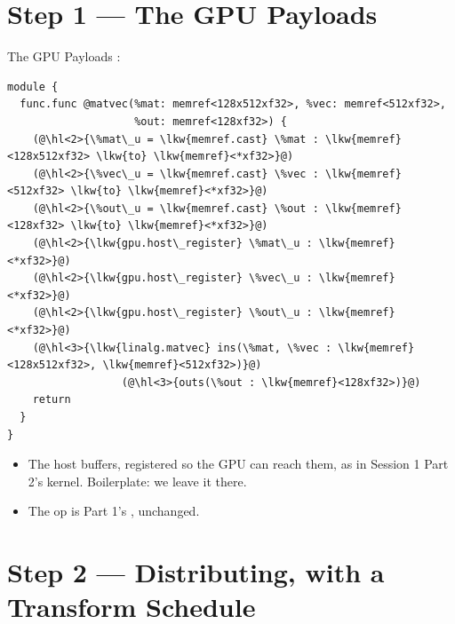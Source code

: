 \documentclass[aspectratio=169,10pt]{beamer}
\begin{document}
\section{Step 1 --- The GPU Payloads}
\begin{frame}[plain]\sectionpage\end{frame}

\begin{frame}[fragile]{The GPU Payloads}
  :
\begin{lstlisting}[language=mlir]
module {
  func.func @matvec(%mat: memref<128x512xf32>, %vec: memref<512xf32>,
                    %out: memref<128xf32>) {
    (@\hl<2>{\%mat\_u = \lkw{memref.cast} \%mat : \lkw{memref}<128x512xf32> \lkw{to} \lkw{memref}<*xf32>}@)
    (@\hl<2>{\%vec\_u = \lkw{memref.cast} \%vec : \lkw{memref}<512xf32> \lkw{to} \lkw{memref}<*xf32>}@)
    (@\hl<2>{\%out\_u = \lkw{memref.cast} \%out : \lkw{memref}<128xf32> \lkw{to} \lkw{memref}<*xf32>}@)
    (@\hl<2>{\lkw{gpu.host\_register} \%mat\_u : \lkw{memref}<*xf32>}@)
    (@\hl<2>{\lkw{gpu.host\_register} \%vec\_u : \lkw{memref}<*xf32>}@)
    (@\hl<2>{\lkw{gpu.host\_register} \%out\_u : \lkw{memref}<*xf32>}@)
    (@\hl<3>{\lkw{linalg.matvec} ins(\%mat, \%vec : \lkw{memref}<128x512xf32>, \lkw{memref}<512xf32>)}@)
                  (@\hl<3>{outs(\%out : \lkw{memref}<128xf32>)}@)
    return
  }
}
\end{lstlisting}
  \vspace{0.2em}
  \begin{itemize}
    \item<2-> The host buffers, registered so the GPU can reach them, as in
      Session 1 Part 2's kernel. Boilerplate: we leave it there.
    \item<3-> The op is Part 1's , unchanged.
  \end{itemize}
\end{frame}

\section{Step 2 --- Distributing, with a Transform Schedule}
\begin{frame}[plain]\sectionpage\end{frame}
\end{document}
